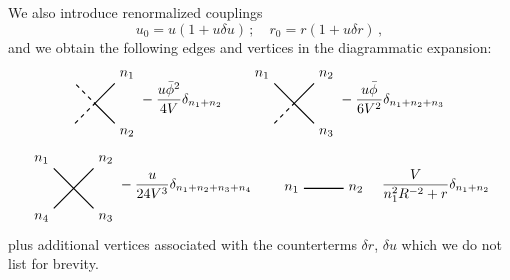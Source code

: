 \documentclass[11pt,a4paper]{article}
\begin{document}
We also introduce renormalized couplings
\begin{equation}
    u_0 = u(1 + u\delta u)\,;\quad r_0 = r(1 + u \delta r)\,,
\end{equation}
and we obtain the following edges and vertices in the diagrammatic expansion:
\begin{displaymath}
\begin{tikzpicture}[scale=0.5, baseline=(current bounding box.center)]
    \draw[dashed, thick] (-1, -1) -- (0, 0) -- (-1, 1);
    \draw[thick] (+1, -1) -- (0, 0) -- (+1, 1);
    \node[above right] at (1, 1) {$n_1$};
    \node[below right] at (1, -1) {$n_2$};
\end{tikzpicture}
    -\frac{u\bar{\phi}^2}{4V}\delta_{n_1 + n_2}
    \quad\quad
\begin{tikzpicture}[scale=0.5, baseline=(current bounding box.center)]
    \draw[dashed, thick] (-1, -1) -- (0, 0);
    \draw[thick] (0, 0) -- (-1, 1);
    \draw[thick] (+1, -1) -- (0, 0) -- (+1, 1);
    \node[above left] at (-1, 1) {$n_1$};
    \node[above right] at (1, 1) {$n_2$};
    \node[below right] at (1, -1) {$n_3$};
\end{tikzpicture}
    -\frac{u\bar{\phi}}{6V^2}\delta_{n_1 + n_2 + n_3}
\end{displaymath}
\begin{displaymath}
\begin{tikzpicture}[scale=0.5, baseline=(current bounding box.center)]
    \draw[thick] (-1, -1) -- (1, 1);
    \draw[thick] (-1, 1) -- ( 1, -1);
    \node[above left] at (-1, 1) {$n_1$};
    \node[above right] at (1, 1) {$n_2$};
    \node[below right] at (1, -1) {$n_3$};
    \node[below left] at (-1, -1) {$n_4$};
\end{tikzpicture}
    -\frac{u}{24V^3}\delta_{n_1 + n_2 + n_3 + n_4}
\quad\quad
\begin{tikzpicture}[scale=0.5, baseline=(current bounding box.center)]
    \draw[thick] (-1, 0) -- (1, 0);
    \node[left] at (-1, 0) {$n_1$};
    \node[right] at (1, 0) {$n_2$};
\end{tikzpicture}
    \quad
    \frac{V}{n_1^2R^{-2} + r}\delta_{n_1 + n_2}
\end{displaymath}
plus additional vertices associated with the counterterms $\delta r$, $\delta
u$ which we do not list for brevity.
\end{document}
